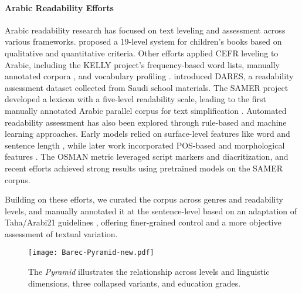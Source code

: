 \paragraph{Arabic Readability Efforts}
Arabic readability research has focused on text leveling and assessment across various frameworks.  proposed a 19-level system for children's books based on qualitative and quantitative criteria. Other efforts applied CEFR leveling to Arabic, including the KELLY project’s frequency-based word lists, manually annotated corpora \cite{habash-palfreyman-2022-zaebuc, naous-etal-2024-readme}, and vocabulary profiling \cite{soliman2024creating}.
\citet{el-haj-etal-2024-dares} introduced DARES, a readability assessment dataset collected from Saudi school materials.
The SAMER project \cite{al-khalil-etal-2020-large} developed a lexicon with a five-level readability scale, leading to the first manually annotated Arabic parallel corpus for text simplification \cite{alhafni-etal-2024-samer}.
%
Automated readability assessment has also been explored through rule-based and machine learning approaches. Early models relied on surface-level features like word and sentence length \cite{al2004assessment, Al-Khalifa:2010:automatic}, while later work incorporated POS-based and morphological features \cite{Forsyth:2014:automatic, Saddiki:2018:feature}. The OSMAN metric \cite{el-haj-rayson-2016-osman} leveraged script markers and diacritization, and recent efforts \cite{liberato-etal-2024-strategies} achieved strong results using pretrained models on the SAMER corpus. 

Building on these efforts, we curated the {\barec} corpus across genres and readability levels, and manually annotated it at the sentence-level based on an adaptation of Taha/Arabi21 guidelines \cite{Taha:2017:guidelines}, offering finer-grained control and a more objective assessment of textual variation.





\begin{figure*}[t]
\centering
 \texttt{[image: Barec-Pyramid-new.pdf]}
    \caption{ The {\barec} \textit{Pyramid}  illustrates the relationship across {\barec} levels and linguistic dimensions, three collapsed variants, and education grades.}
\label{fig:barec-pyramid}
\end{figure*}


%